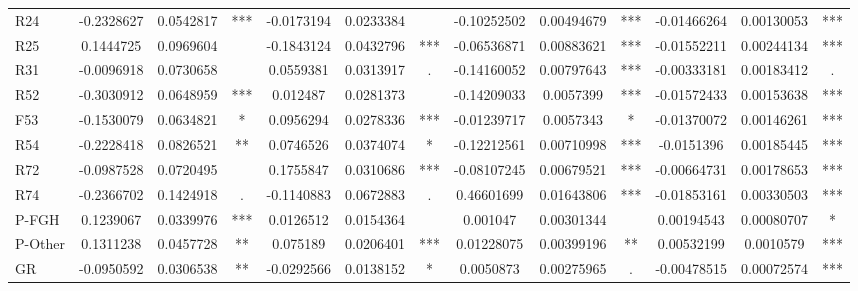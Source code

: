 \documentclass[11pt,letterpaper]{article}
\numberwithin{equation}{section}
\numberwithin{equation}{section}
\numberwithin{equation}{section}
\begin{document}
\begin{center}
\begin{table}
\begin{tabular}{|l|ccc|ccc|ccc|ccc|}
R24       & -0.2328627 & 0.0542817 & *** & -0.0173194 & 0.0233384 &     & -0.10252502 & 0.00494679 & *** & -0.01466264 & 0.00130053 & *** \\
R25       & 0.1444725  & 0.0969604 &     & -0.1843124 & 0.0432796 & *** & -0.06536871 & 0.00883621 & *** & -0.01552211 & 0.00244134 & *** \\
R31       & -0.0096918 & 0.0730658 &     & 0.0559381  & 0.0313917 & .   & -0.14160052 & 0.00797643 & *** & -0.00333181 & 0.00183412 & .   \\
R52       & -0.3030912 & 0.0648959 & *** & 0.012487   & 0.0281373 &     & -0.14209033 & 0.0057399  & *** & -0.01572433 & 0.00153638 & *** \\
F53       & -0.1530079 & 0.0634821 & *   & 0.0956294  & 0.0278336 & *** & -0.01239717 & 0.0057343  & *   & -0.01370072 & 0.00146261 & *** \\
R54       & -0.2228418 & 0.0826521 & **  & 0.0746526  & 0.0374074 & *   & -0.12212561 & 0.00710998 & *** & -0.0151396  & 0.00185445 & *** \\
R72       & -0.0987528 & 0.0720495 &     & 0.1755847  & 0.0310686 & *** & -0.08107245 & 0.00679521 & *** & -0.00664731 & 0.00178653 & *** \\
R74       & -0.2366702 & 0.1424918 & .   & -0.1140883 & 0.0672883 & .   & 0.46601699  & 0.01643806 & *** & -0.01853161 & 0.00330503 & *** \\
P-FGH     & 0.1239067  & 0.0339976 & *** & 0.0126512  & 0.0154364 &     & 0.001047    & 0.00301344 &     & 0.00194543  & 0.00080707 & *   \\
P-Other   & 0.1311238  & 0.0457728 & **  & 0.075189   & 0.0206401 & *** & 0.01228075  & 0.00399196 & **  & 0.00532199  & 0.0010579  & *** \\
GR        & -0.0950592 & 0.0306538 & **  & -0.0292566 & 0.0138152 & *   & 0.0050873   & 0.00275965 & .   & -0.00478515 & 0.00072574 & *** \\
\hline\hline
\end{tabular}
\end{table}
\end{center}



\end{document}
